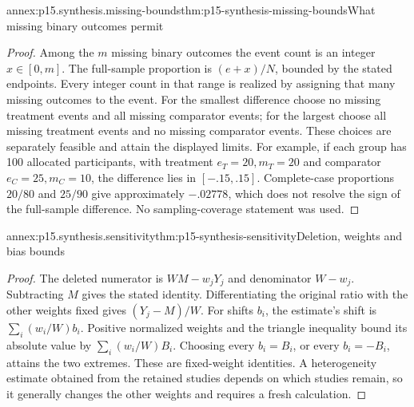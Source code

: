 \begin{annexitem}{annex:p15.synthesis.missing-bounds}{thm:p15-synthesis-missing-bounds}{What missing binary outcomes permit}
\begin{proof}
Among the \(m\) missing binary outcomes the event count is an integer
\(x\in[0,m]\). The full-sample proportion is \((e+x)/N\),
bounded by the stated endpoints. Every integer count in that range is
realized by assigning that many missing outcomes to the event.
For the smallest difference choose no missing treatment events and all
missing comparator events; for the largest choose all missing treatment
events and no missing comparator events. These choices are separately
feasible and attain the displayed limits. For example, if each group has
100 allocated participants, with treatment \(e_T=20,m_T=20\) and
comparator \(e_C=25,m_C=10\), the difference lies in
\([-.15,.15]\). Complete-case proportions \(20/80\) and \(25/90\)
give approximately \(-.02778\), which does not resolve the sign of the
full-sample difference. No sampling-coverage statement was used.
\end{proof}
\end{annexitem}

\begin{annexitem}{annex:p15.synthesis.sensitivity}{thm:p15-synthesis-sensitivity}{Deletion, weights and bias bounds}
\begin{proof}
The deleted numerator is \(WM-w_jY_j\) and denominator \(W-w_j\).
Subtracting \(M\) gives the stated identity. Differentiating the original
ratio with the other weights fixed gives \((Y_j-M)/W\).
For shifts \(b_i\), the estimate's shift is \(\sum_i(w_i/W)b_i\).
Positive normalized weights and the triangle inequality bound its absolute
value by \(\sum_i(w_i/W)B_i\). Choosing every \(b_i=B_i\), or
every \(b_i=-B_i\), attains the two extremes. These are fixed-weight
identities. A heterogeneity estimate obtained from the retained studies
depends on which studies remain, so it generally changes the other weights
and requires a fresh calculation.
\end{proof}
\end{annexitem}

